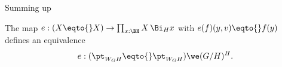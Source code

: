Summing up
\begin{lemma}
  \label{lem:WGHisHfixofG/H}
  The map  $e:(X\eqto{}X)\to \prod_{x:\BH}X\, \Bi_Hx$ with $e(f)(y,v)\eqto{}f(y)$ defines an equivalence
$$e:(\pt_{W_GH}\eqto{}\pt_{W_GH})\we (G/H)^H.$$
\end{lemma}



